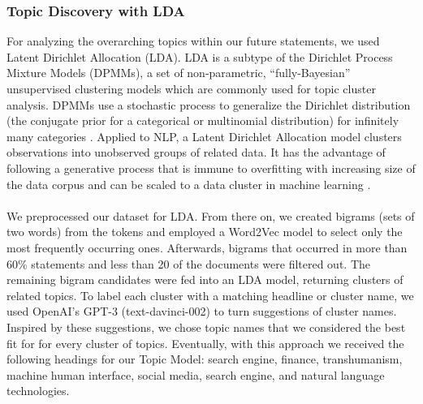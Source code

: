 \subsubsection{Topic Discovery with LDA}
\label{lda}
For analyzing the overarching topics within our future statements, we used Latent Dirichlet Allocation (LDA). LDA is a subtype of the Dirichlet Process Mixture Models (DPMMs), a set of non-parametric, “fully-Bayesian” unsupervised clustering models which are commonly used for topic cluster analysis. DPMMs use a stochastic process to generalize the Dirichlet distribution (the conjugate prior for a categorical or multinomial distribution) for infinitely many categories \citep{li2019tutorial}.
Applied to NLP, a Latent Dirichlet Allocation model clusters observations into unobserved groups of related data. It has the advantage of following a generative process that is immune to overfitting with increasing size of the data corpus and can be scaled to a data cluster in machine learning \citep{pritchard2000inference}.
\\
\\
We preprocessed our dataset for LDA.
From there on, we created bigrams (sets of two words) from the tokens and employed a Word2Vec model to select only the most frequently occurring ones.
Afterwards, bigrams that occurred in more than 60\% statements and less than 20 of the documents were filtered out. The remaining bigram candidates were fed into an LDA model, returning clusters of related topics. To label each cluster with a matching headline or cluster name, we used OpenAI’s GPT-3 (text-davinci-002) to turn suggestions of cluster names.
\\
Inspired by these suggestions, we chose topic names that we considered the best fit for for every cluster of topics.
Eventually, with this approach we received the following headings for our Topic Model: search engine, finance, transhumanism, machine human interface, social media, search engine, and natural language technologies.


